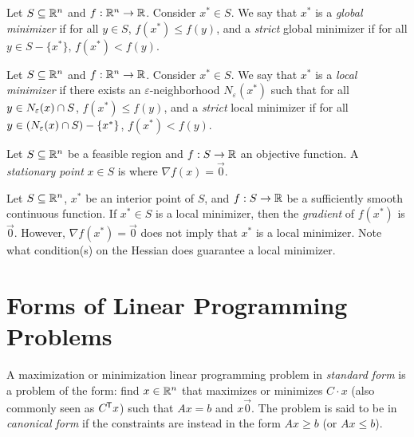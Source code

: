 \begin{defn}
    Let $S \subseteq \mathbb{R}^n$ and $f: \mathbb{R}^n \to \mathbb{R}$. Consider $x^* \in S$. We say that $x^*$ is a \emph{global minimizer} if for all $y \in S$, $f(x^*) \leq f(y)$, and a \emph{strict} global minimizer if for all $y \in S - \{x^*\}$, $f(x^*) < f(y)$.
\end{defn}

\begin{defn}
    Let $S \subseteq \mathbb{R}^n$ and $f: \mathbb{R}^n \to \mathbb{R}$. Consider $x^* \in S$. We say that $x^*$ is a \emph{local minimizer} if there exists an $\varepsilon$-neighborhood $N_{\varepsilon}(x^*)$ such that for all $y \in N_{\varepsilon}(x) \cap S$, $f(x^*) \leq f(y)$, and a \emph{strict} local minimizer if for all $y \in \left(N_{\varepsilon}(x) \cap S\right) - \{x^*\}$, $f(x^*) < f(y)$.
\end{defn}

\begin{defn}
    Let $S \subseteq \mathbb{R}^n$ be a feasible region and $f: S \to \mathbb{R}$ an objective function. A \emph{stationary point} $x \in S$ is where $\nabla f(x) = \vec{0}.$
\end{defn}

\begin{rmk}
    Let $S \subseteq \mathbb{R}^n$, $x^*$ be an interior point of $S$, and $f: S \to \mathbb{R}$ be a sufficiently smooth continuous function. If $x^* \in S$ is a local minimizer, then the \emph{gradient} of $f(x^*)$ is $\vec{0}$. However, $\nabla f(x^*) = \vec{0}$ does not imply that $x^*$ is a local minimizer. {\color{red}Note what condition(s) on the Hessian does guarantee a local minimizer.}
\end{rmk}

\section{Forms of Linear Programming Problems}

\begin{defn}
    A maximization or minimization linear programming problem in \emph{standard form} is a problem of the form:
    find $x \in \mathbb{R}^n$ that maximizes or minimizes $C \cdot x$ (also commonly seen as $C^{\mkern-1.5mu\mathsf{T}}x$) such that $Ax = b$ and $x \vec{0}$. The problem is said to be in \emph{canonical form} if the constraints are instead in the form $Ax \geq b$ (or $Ax \leq b$).
\end{defn}

